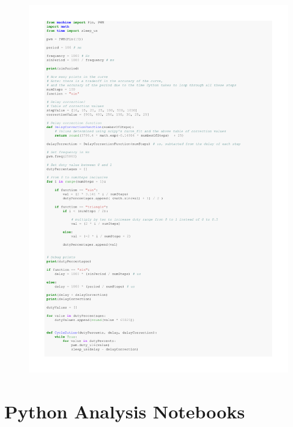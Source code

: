 \documentclass[%
 reprint,
 amsmath,amssymb,
 aps,
]{revtex4-2}
\begin{document}
    \begin{figure}[h]
        \includegraphics[width=\columnwidth,page=2]{Images/functionGenerator.pdf}
    \end{figure}

\clearpage
\section{Python Analysis Notebooks}
    
\end{document}
